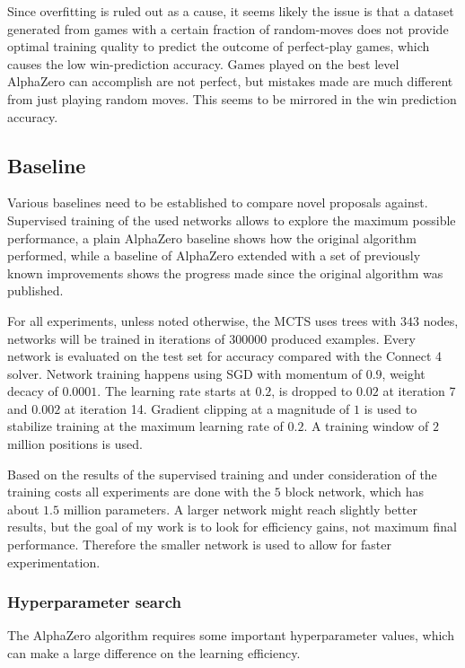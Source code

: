\documentclass[12pt,onecolumn,oneside,titlepage]{article}
\begin{document}
Since overfitting is ruled out as a cause, it seems likely the issue is that a dataset generated from games with a certain fraction of random-moves does not provide optimal training quality to predict the outcome of perfect-play games, which causes the low win-prediction accuracy.
Games played on the best level AlphaZero can accomplish are not perfect, but mistakes made are much different from just playing random moves. This seems to be mirrored in the win prediction accuracy.


\subsection{Baseline}

Various baselines need to be established to compare novel proposals against. Supervised training of the used networks allows to explore the maximum possible performance, a plain AlphaZero baseline shows how the original algorithm performed, while a baseline
of AlphaZero extended with a set of previously known improvements shows the progress made since the original algorithm was published.

For all experiments, unless noted otherwise, the MCTS uses trees with $343$ nodes, networks will be trained in iterations of $300000$ produced examples. Every network is evaluated on the test set for accuracy compared with the Connect 4 solver.
Network training happens using SGD with momentum of $0.9$, weight decacy of $0.0001$. The learning rate starts at $0.2$, is dropped to $0.02$ at iteration 7 and $0.002$ at iteration 14. Gradient clipping at a magnitude of $1$ is used to stabilize training at the maximum learning rate of $0.2$.
A training window of $2$ million positions is used.


Based on the results of the supervised training and under consideration of the training costs all experiments are done with the $5$ block network, which has about $1.5$ million parameters. A larger network might reach slightly better results,
but the goal of my work is to look for efficiency gains, not maximum final performance. Therefore the smaller network is used to allow for faster experimentation.

\subsubsection{Hyperparameter search}

The AlphaZero algorithm requires some important hyperparameter values, which can make a large difference on the learning efficiency. 
\end{document}
